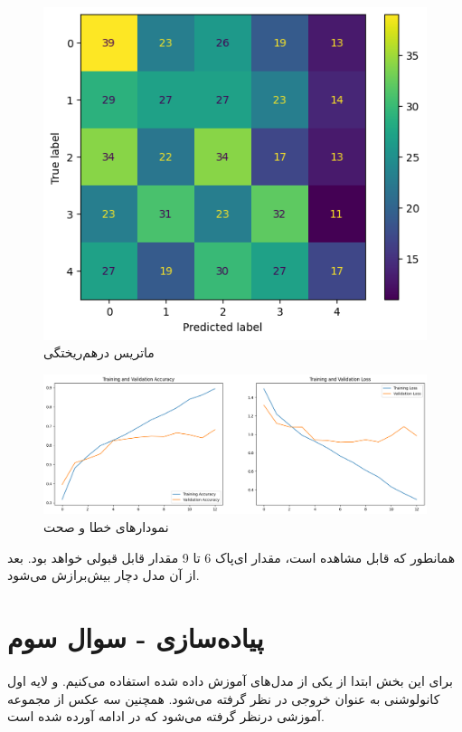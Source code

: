 \documentclass{article}
\begin{document}
\begin{figure}[!h]
    \centering\includegraphics[scale=.70]{./p1-22}
    \caption{ماتریس درهم‌ریختگی}\label{fig.122}
\end{figure}

\begin{figure}[!h]
    \centering\includegraphics[scale=.45]{./p1-23}
    \caption{نمودارهای خطا و صحت}\label{fig.123}
\end{figure}


\cleardoublepage

همانطور که قابل مشاهده است، مقدار ای‌پاک 6 تا 9 مقدار قابل قبولی خواهد بود. بعد از آن مدل دچار بیش‌برازش می‌شود.

\section{پیاده‌سازی - سوال سوم}

برای این بخش ابتدا از یکی از مدل‌های آموزش داده شده استفاده می‌کنیم. و لایه اول کانولوشنی به عنوان خروجی در نظر گرفته می‌شود. همچنین سه عکس از مجموعه آموزشی درنظر گرفته می‌شود که در ادامه آورده شده است.
\end{document}
